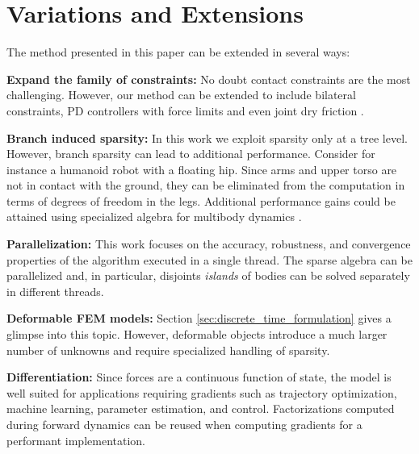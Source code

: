 \section{Variations and Extensions}
\label{sec:variations_and_extensions}

The method presented in this paper can be extended in several ways:

\textbf{Expand the family of constraints:} No doubt contact constraints are the
most challenging. However, our method can be extended to include bilateral
constraints, PD controllers with force limits and even joint dry friction
\cite{bib:todorov2014}.

\textbf{Branch induced sparsity:} In this work we exploit sparsity only at a
tree level. However, branch sparsity can lead to additional performance.
Consider for instance a humanoid robot with a floating hip. Since arms and upper
torso are not in contact with the ground, they can be eliminated from the
computation in terms of degrees of freedom in the legs. Additional performance
gains could be attained using specialized algebra for multibody dynamics
\cite{bib:carpentier2021}.

\textbf{Parallelization:} This work focuses on the accuracy, robustness, and
convergence properties of the algorithm executed in a single thread. The sparse
algebra can be parallelized and, in particular, disjoints \emph{islands} of
bodies can be solved separately in different threads.

\textbf{Deformable FEM models:} Section \ref{sec:discrete_time_formulation}
gives a glimpse into this topic. However, deformable objects introduce a much
larger number of unknowns and require specialized handling of sparsity.

\textbf{Differentiation:} Since forces are a continuous function of state, the
model is well suited for applications requiring gradients such as trajectory
optimization, machine learning, parameter estimation, and control.
Factorizations computed during forward dynamics can be reused when computing
gradients for a performant implementation.
